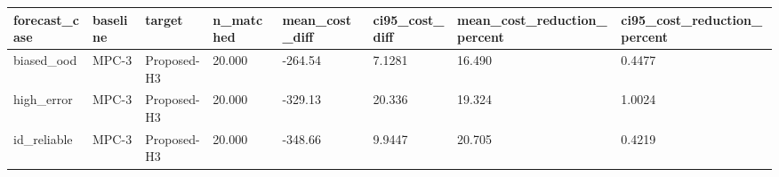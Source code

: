 \begin{tabular}{llllllll}
\toprule
forecast\_case & baseline & target & n\_matched & mean\_cost\_diff & ci95\_cost\_diff & mean\_cost\_reduction\_percent & ci95\_cost\_reduction\_percent \\
\midrule
biased\_ood & MPC-3 & Proposed-H3 & 20.000 & -264.54 & 7.1281 & 16.490 & 0.4477 \\
high\_error & MPC-3 & Proposed-H3 & 20.000 & -329.13 & 20.336 & 19.324 & 1.0024 \\
id\_reliable & MPC-3 & Proposed-H3 & 20.000 & -348.66 & 9.9447 & 20.705 & 0.4219 \\
\bottomrule
\end{tabular}
